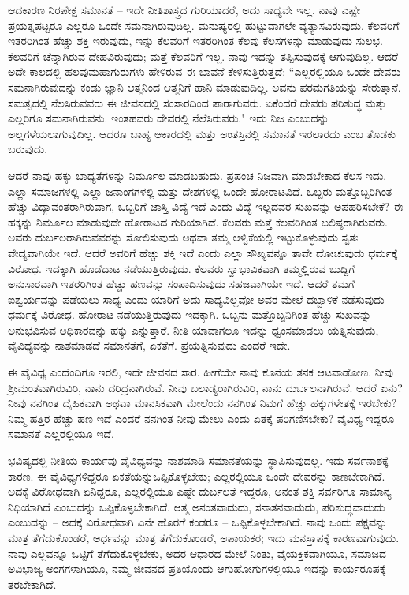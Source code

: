 ಆದಕಾರಣ ನಿರಪೇಕ್ಷ ಸಮಾನತೆ  – ಇದೇ ನೀತಿಶಾಸ್ತ್ರದ ಗುರಿಯಾದರೆ, ಅದು ಸಾಧ್ಯವೇ ಇಲ್ಲ. ನಾವು ಎಷ್ಟೇ ಪ್ರಯತ್ನಪಟ್ಟರೂ ಎಲ್ಲರೂ ಒಂದೇ ಸಮನಾಗಿರುವುದಿಲ್ಲ. ಮನುಷ್ಯರಲ್ಲಿ ಹುಟ್ಟುವಾಗಲೇ ವ್ಯತ್ಯಾಸವಿರುವುದು. ಕೆಲವರಿಗೆ ಇತರರಿಗಿಂತ ಹೆಚ್ಚು ಶಕ್ತಿ ಇರುವುದು, ಇನ್ನು ಕೆಲವರಿಗೆ ಇತರರಿಗಿಂತ ಕೆಲವು ಕೆಲಸಗಳನ್ನು ಮಾಡುವುದು ಸುಲಭ. ಕೆಲವರಿಗೆ ಚೆನ್ನಾಗಿರುವ ದೇಹವಿರುವುದು; ಮತ್ತೆ ಕೆಲವರಿಗೆ ಇಲ್ಲ. ನಾವು ಇದನ್ನು ತಪ್ಪಿಸುವುದಕ್ಕೆ ಆಗುವುದಿಲ್ಲ. ಆದರೆ ಅದೇ ಕಾಲದಲ್ಲಿ ಹಲವು\break ಮಹಾಗುರುಗಳು ಹೇಳಿರುವ ಈ ಭಾವನೆ ಕೇಳಿಸುತ್ತಿರುತ್ತದೆ: “ಎಲ್ಲರಲ್ಲಿಯೂ ಒಂದೇ ದೇವರು ಸಮನಾಗಿರುವುದನ್ನು ಕಂಡು ಜ್ಞಾನಿ ಆತ್ಮನಿಂದ ಆತ್ಮನಿಗೆ ಹಾನಿ ಮಾಡುವುದಿಲ್ಲ. ಅವನು ಪರಮಗತಿಯನ್ನು ಸೇರುತ್ತಾನೆ. ಸಮತ್ವದಲ್ಲಿ ನೆಲಸಿರುವವರು ಈ ಜೀವನದಲ್ಲಿ ಸಂಸಾರದಿಂದ ಪಾರಾಗುವರು. ಏಕೆಂದರೆ ದೇವರು ಪರಿಶುದ್ಧ ಮತ್ತು ಎಲ್ಲರಿಗೂ ಸಮನಾಗಿರುವನು. ಇಂತಹವರು ದೇವರಲ್ಲಿ ನೆಲೆಸಿರುವರು." ಇದು ನಿಜ ಎಂಬುದನ್ನು ಅಲ್ಲಗಳೆಯಲಾಗುವುದಿಲ್ಲ. ಆದರೂ ಬಾಹ್ಯ ಆಕಾರದಲ್ಲಿ ಮತ್ತು ಅಂತಸ್ತಿನಲ್ಲಿ ಸಮಾನತೆ ಇರಲಾರದು ಎಂಬ ತೊಡಕು ಬರುವುದು.

\vskip -2pt

ಆದರೆ ನಾವು ಹಕ್ಕು ಬಾಧ್ಯತೆಗಳನ್ನು ನಿರ್ಮೂಲ ಮಾಡಬಹುದು. ಪ್ರಪಂಚ ನಿಜವಾಗಿ ಮಾಡಬೇಕಾದ ಕೆಲಸ ಇದು. ಎಲ್ಲಾ ಸಮಾಜಗಳಲ್ಲಿ ಎಲ್ಲಾ ಜನಾಂಗಗಳಲ್ಲಿ ಮತ್ತು ದೇಶಗಳಲ್ಲಿ ಒಂದೇ ಹೋರಾಟವಿದೆ. ಒಬ್ಬರು ಮತ್ತೊಬ್ಬರಿಗಿಂತ ಹೆಚ್ಚು ವಿದ್ಯಾವಂತರಾಗಿರುವಾಗ, ಒಬ್ಬರಿಗೆ ಜಾಸ್ತಿ ವಿದ್ಯೆ ಇದೆ ಎಂದು ವಿದ್ಯೆ ಇಲ್ಲದವರ ಸುಖವನ್ನು ಅಪಹರಿಸಬೇಕೆ? ಈ ಹಕ್ಕನ್ನು ನಿರ್ಮೂಲ ಮಾಡುವುದೇ ಹೋರಾಟದ ಗುರಿಯಾಗಿದೆ. ಕೆಲವರು ಮತ್ತೆ ಕೆಲವರಿಗಿಂತ ಬಲಿಷ್ಠರಾಗಿರುವರು. ಅವರು ದುರ್ಬಲರಾಗಿರುವವರನ್ನು ಸೋಲಿಸುವುದು ಅಥವಾ ತಮ್ಮ ಆಳ್ವಿಕೆಯಲ್ಲಿ ಇಟ್ಟುಕೊಳ್ಳುವುದು ಸ್ವತಃ ವೇದ್ಯವಾಗಿಯೇ ಇದೆ. ಆದರೆ ಅವರಿಗೆ ಹೆಚ್ಚು ಶಕ್ತಿ ಇದೆ ಎಂದು ಎಲ್ಲಾ ಸೌಖ್ಯವನ್ನೂ ತಾವೇ ದೋಚುವುದು ಧರ್ಮಕ್ಕೆ ವಿರೋಧ. ಇದಕ್ಕಾಗಿ ಹೊಡೆದಾಟ ನಡೆಯುತ್ತಿರುವುದು. ಕೆಲವರು ಸ್ವಾಭಾವಿಕವಾಗಿ ತಮ್ಮಲ್ಲಿರುವ ಬುದ್ದಿಗೆ ಅನುಸಾರವಾಗಿ ಇತರರಿಗಿಂತ ಹೆಚ್ಚು ಹಣವನ್ನು ಸಂಪಾದಿಸುವುದು ಸಹಜವಾಗಿಯೇ ಇದೆ. ಆದರೆ ತಮಗೆ ಐಶ್ವರ್ಯವನ್ನು ಪಡೆಯಲು ಸಾಧ್ಯ ಎಂದು ಯಾರಿಗೆ ಅದು ಸಾಧ್ಯವಿಲ್ಲವೋ ಅವರ ಮೇಲೆ ದಬ್ಬಾಳಿಕೆ ನಡೆಸುವುದು ಧರ್ಮಕ್ಕೆ ವಿರೋಧ. ಹೋರಾಟ ನಡೆಯುತ್ತಿರುವುದು ಇದಕ್ಕಾಗಿ. ಒಬ್ಬನು ಮತ್ತೊಬ್ಬನಿಗಿಂತ ಹೆಚ್ಚು ಸುಖವನ್ನು ಅನುಭವಿಸುವ ಅಧಿಕಾರವನ್ನು ಹಕ್ಕು ಎನ್ನುತ್ತಾರೆ. ನೀತಿ ಯಾವಾಗಲೂ ಇದನ್ನು ಧ್ವಂಸಮಾಡಲು ಯತ್ನಿಸುವುದು, ವೈವಿಧ್ಯವನ್ನು ನಾಶಮಾಡದೆ ಸಮಾನತೆಗೆ, ಏಕತೆಗೆ. ಪ್ರಯತ್ನಿಸುವುದು ಎಂದರೆ ಇದೇ.

\vskip -2pt

ಈ ವೈವಿಧ್ಯ ಎಂದೆಂದಿಗೂ ಇರಲಿ, ಇದೇ ಜೀವನದ ಸಾರ. ಹೀಗೆಯೇ ನಾವು ಕೊನೆಯ ತನಕ ಆಟವಾಡೋಣ. ನೀವು ಶ‍್ರೀಮಂತವಾಗಿರುವಿರಿ, ನಾನು ದರಿದ್ರನಾಗಿರುವೆ. ನೀವು ಬಲಾಡ್ಯರಾಗಿರುವಿರಿ, ನಾನು ದುರ್ಬಲನಾಗಿರುವೆ. ಆದರೆ ಏನು? ನೀವು ನನಗಿಂತ ದೈಹಿಕವಾಗಿ ಅಥವಾ ಮಾನಸಿಕವಾಗಿ ಮೇಲೆಂದು ನನಗಿಂತ ನಿಮಗೆ ಹೆಚ್ಚು ಹಕ್ಕುಗಳೇತಕ್ಕೆ ಇರಬೇಕು? ನಿಮ್ಮ ಹತ್ತಿರ ಹೆಚ್ಚು ಹಣ ಇದೆ ಎಂದರೆ ನನಗಿಂತ ನೀವು ಮೇಲು ಎಂದು ಏತಕ್ಕೆ ಪರಿಗಣಿಸಬೇಕು? ವೈವಿಧ್ಯ ಇದ್ದರೂ ಸಮಾನತೆ ಎಲ್ಲರಲ್ಲಿಯೂ ಇದೆ.

ಭವಿಷ್ಯದಲ್ಲಿ ನೀತಿಯ ಕಾರ್ಯವು ವೈವಿಧ್ಯವನ್ನು ನಾಶಮಾಡಿ ಸಮಾನತೆಯನ್ನು ಸ್ಥಾಪಿಸುವುದಲ್ಲ. ಇದು ಸರ್ವನಾಶಕ್ಕೆ ಕಾರಣ. ಈ ವೈವಿಧ್ಯಗಳಿದ್ದರೂ ಏಕತೆಯನ್ನು\break ಒಪ್ಪಿಕೊಳ್ಳಬೇಕು; ಎಲ್ಲರಲ್ಲಿಯೂ ಒಂದೇ ದೇವರನ್ನು ಕಾಣಬೇಕಾಗಿದೆ. ಅದಕ್ಕೆ ವಿರೋಧವಾಗಿ ಏನಿದ್ದರೂ, ಎಲ್ಲರಲ್ಲಿಯೂ ಎಷ್ಟೇ ದುರ್ಬಲತೆ ಇದ್ದರೂ, ಅನಂತ ಶಕ್ತಿ ಸರ್ವರಿಗೂ ಸಾಮಾನ್ಯ ನಿಧಿಯಾಗಿದೆ ಎಂಬುದನ್ನು ಒಪ್ಪಿಕೊಳ್ಳಬೇಕಾಗಿದೆ. ಆತ್ಮ ಅನಂತವಾದುದು, ಸನಾತನವಾದುದು, ಪರಿಶುದ್ಧವಾದುದು ಎಂಬುದನ್ನು – ಅದಕ್ಕೆ ವಿರೋಧವಾಗಿ ಏನೇ ಹೊರಗೆ ಕಂಡರೂ – ಒಪ್ಪಿಕೊಳ್ಳಬೇಕಾಗಿದೆ. ನಾವು ಒಂದು ಪಕ್ಷವನ್ನು ಮಾತ್ರ ತೆಗೆದುಕೊಂಡರೆ, ಅರ್ಧವನ್ನು ಮಾತ್ರ ತೆಗೆದುಕೊಂಡರೆ, ಅಪಾಯಕರ; ಇದು ಮನಸ್ತಾಪಕ್ಕೆ ಕಾರಣವಾಗುವುದು. ನಾವು ಎಲ್ಲವನ್ನೂ ಒಟ್ಟಿಗೆ ತೆಗೆದುಕೊಳ್ಳಬೇಕು, ಅದರ ಆಧಾರದ ಮೇಲೆ ನಿಂತು, ವೈಯಕ್ತಿಕವಾಗಿಯೂ, ಸಮಾಜದ ಅವಿಭಾಜ್ಯ ಅಂಗಗಳಾಗಿಯೂ, ನಮ್ಮ ಜೀವನದ ಪ್ರತಿಯೊಂದು ಆಗುಹೋಗುಗಳಲ್ಲಿಯೂ ಇದನ್ನು ಕಾರ್ಯರೂಪಕ್ಕೆ ತರಬೇಕಾಗಿದೆ.

